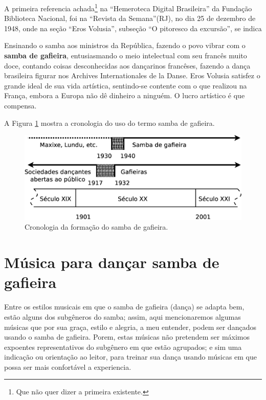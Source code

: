 A primeira referencia achada\footnote{Que não quer dizer a primeira existente.} 
na ``Hemeroteca Digital Brasileira'' da Fundação Biblioteca Nacional,
foi na ``Revista da Semana''(RJ), no dia 25 de dezembro de 1948,
onde na seção ``Eros Volusia'', subseção ``O pitoresco da excursão'', se indica \cite[pp. 48]{sambagafieirarefbn}
\begin{citando}
Ensinando o samba aos ministros da República, 
fazendo o povo vibrar com o \textbf{samba de gafieira}, entusiasmando
o meio intelectual com seu francês muito doce,
contando coisas desconhecidas aos dançarinos francêses,
fazendo a dança brasileira figurar nos Archives Internationales de la Danse.
Eros Volusia satisfez o grande ideal de sua vida artística, sentindo-se contente
com o que realizou na França, embora a Europa não dê dinheiro a ninguém.
O lucro artístico é que compensa.
\end{citando}


A Figura \ref{fig:sambagafieiracrono} mostra a cronologia do uso do termo samba de gafieira. 

\begin{figure}[h]
  \centering
    \includegraphics[width=1.0\textwidth]{chapters/cap-historia-sambagafieira/gafieira-crono.eps}
  \caption{ Cronologia da formação do samba de gafieira.}
\label{fig:sambagafieiracrono}
\end{figure}

\section{Música para dançar samba de gafieira}
\label{subsec:gafieiradancaestilos}

Entre os estilos musicais em que o samba de gafieira (dança) se adapta bem, 
estão alguns dos subgêneros do samba; assim,
aqui mencionaremos algumas músicas que por sua graça, estilo e alegria,
a meu entender, podem ser dançados usando o samba de gafieira. Porem, 
estas músicas não pretendem ser máximos expoentes representativos do subgênero em que estão agrupados;
e sim uma indicação ou orientação ao leitor, 
para treinar sua dança usando músicas em que possa ser mais confortável a experiencia.

